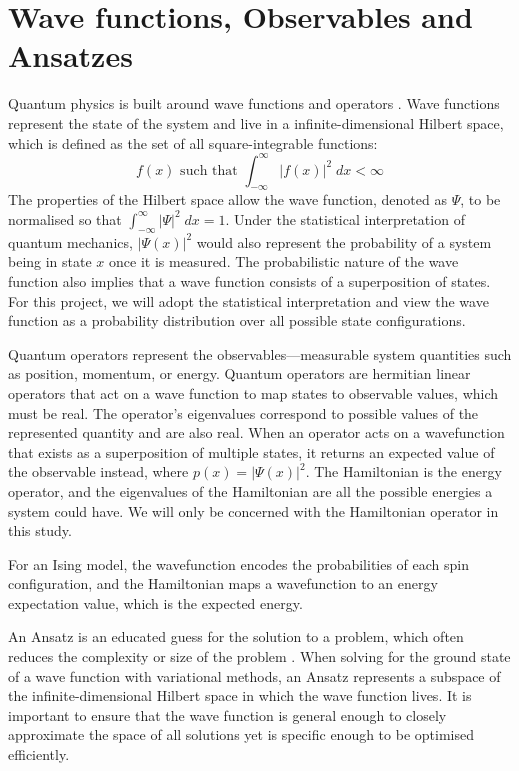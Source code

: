 \section{Wave functions, Observables and Ansatzes}\label{wavefunction}
Quantum physics is built around wave functions and operators \cite{GriffithsSchroeter2018}. Wave functions represent the state of the system and live in a infinite-dimensional Hilbert space, which is defined as the set of all square-integrable functions:
\begin{equation*}
    f(x) \text{ such that } \int_{-\infty}^\infty |f(x)|^2 \; dx < \infty
\end{equation*}
The properties of the Hilbert space allow the wave function, denoted as $\Psi$, to be normalised so that $\int_{-\infty}^\infty |\Psi|^2 \; dx = 1$. Under the statistical interpretation of quantum mechanics, $|\Psi(x)|^2$ would also represent the probability of a system being in state $x$ once it is measured. The probabilistic nature of the wave function also implies that a wave function consists of a superposition of states. For this project, we will adopt the statistical interpretation and view the wave function as a probability distribution over all possible state configurations.

Quantum operators represent the observables---measurable system quantities such as position, momentum, or energy. Quantum operators are hermitian linear operators that act on a wave function to map states to observable values, which must be real. The operator's eigenvalues correspond to possible values of the represented quantity and are also real. When an operator acts on a wavefunction that exists as a superposition of multiple states, it returns an expected value of the observable instead, where $p(x) = |\Psi (x)|^2$. The Hamiltonian is the energy operator, and the eigenvalues of the Hamiltonian are all the possible energies a system could have. We will only be concerned with the Hamiltonian operator in this study.

For an Ising model, the wavefunction encodes the probabilities of each spin configuration, and the Hamiltonian maps a wavefunction to an energy expectation value, which is the expected energy.

An Ansatz is an educated guess for the solution to a problem, which often reduces the complexity or size of the problem \cite{qaoareview}. When solving for the ground state of a wave function with variational methods, an Ansatz represents a subspace of the infinite-dimensional Hilbert space in which the wave function lives. It is important to ensure that the wave function is general enough to closely approximate the space of all solutions yet is specific enough to be optimised efficiently.

